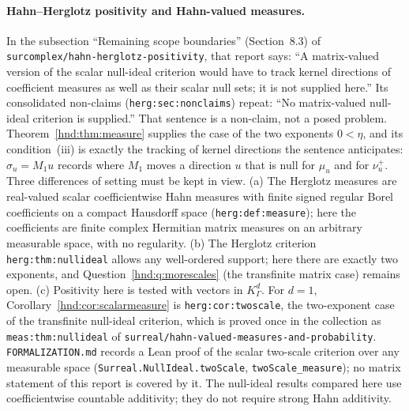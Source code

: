 \documentclass[11pt,oneside]{article}
\theoremstyle{definition}
\theoremstyle{remark}
\newcommand{\repo}[1]{\nolinkurl{#1}}%
\newcommand{\lbl}[1]{\nolinkurl{#1}}%
\begin{document}
\paragraph{Hahn--Herglotz positivity and Hahn-valued measures.} In the
subsection ``Remaining scope boundaries'' (Section~8.3) of
\repo{surcomplex/hahn-herglotz-positivity}, that report says: ``A
matrix-valued version of the scalar null-ideal criterion would have to track
kernel directions of coefficient measures as well as their scalar null
sets; it is not supplied here.'' Its consolidated non-claims
(\lbl{herg:sec:nonclaims}) repeat: ``No matrix-valued null-ideal criterion
is supplied.'' That sentence is a non-claim, not a posed problem.
Theorem~\ref{hnd:thm:measure} supplies the case of the two exponents
$0<\eta$, and its condition~(iii) is exactly the tracking of kernel
directions the sentence anticipates: $\sigma_u=M_1u$ records where $M_1$
moves a direction $u$ that is null for $\mu_u$ and for $\nu_u^+$. Three
differences of setting must be kept in view. (a) The Herglotz measures are
real-valued scalar coefficientwise Hahn measures with finite signed regular
Borel coefficients on a compact Hausdorff space (\lbl{herg:def:measure});
here the coefficients are finite complex Hermitian matrix measures on an
arbitrary measurable space, with no regularity. (b) The Herglotz criterion
\lbl{herg:thm:nullideal} allows any well-ordered support; here there are
exactly two exponents, and Question~\ref{hnd:q:morescales} (the transfinite
matrix case) remains open. (c) Positivity here is tested with vectors in
$K_\Gamma^d$. For $d=1$, Corollary~\ref{hnd:cor:scalarmeasure} is
\lbl{herg:cor:twoscale}, the two-exponent case of the transfinite
null-ideal criterion, which is proved once in the collection as
\lbl{meas:thm:nullideal} of \repo{surreal/hahn-valued-measures-and-probability}.
\repo{FORMALIZATION.md} records a Lean proof of the scalar two-scale
criterion over any measurable space (\texttt{Surreal.NullIdeal.twoScale},
\texttt{twoScale\_measure}); no matrix statement of this report is covered
by it. The null-ideal results compared here use coefficientwise countable
additivity; they do not require strong Hahn additivity.
\end{document}
